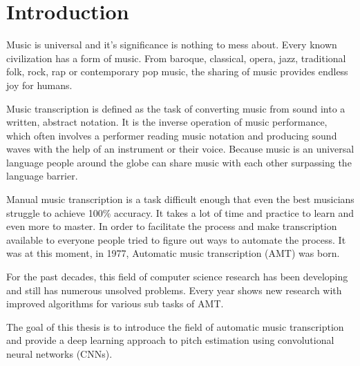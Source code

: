 \newpage
\section{Introduction}
Music is universal and it's significance is nothing to mess about. Every known civilization has a form of music. From baroque, classical, opera, jazz, traditional folk, rock, rap or contemporary pop music, the sharing of music provides endless joy for humans.
\par
Music transcription is defined as the task of converting music from sound into a written, abstract notation.
It is the inverse operation of music performance, which often involves a performer reading music notation and producing sound waves with the help of an instrument or their voice. Because music is an universal language people around the globe can share music with each other surpassing the language barrier.
\par
Manual music transcription is a task difficult enough that even the best musicians struggle to achieve 100\% accuracy. It takes a lot of time and practice to learn and even more to master. In order to facilitate the process and make transcription available to everyone people tried to figure out ways to automate the process. It was at this moment, in 1977, Automatic music transcription (AMT) was born.
\par
For the past decades, this field of computer science research has been developing and still has numerous unsolved problems. Every year shows new research with improved algorithms for various sub tasks of AMT.
\par
The goal of this thesis is to introduce the field of automatic music transcription and provide a deep learning approach to pitch estimation using convolutional neural networks (CNNs).